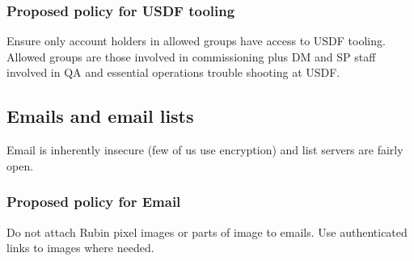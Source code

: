 \subsubsection{Proposed policy for USDF tooling}
Ensure only account holders in allowed groups have access to USDF tooling.
Allowed groups are those involved in commissioning plus DM and SP staff involved in QA and essential operations trouble shooting at USDF.

\subsection{Emails and email  lists }
Email is inherently insecure (few of us use encryption) and list servers are fairly open.

\subsubsection{Proposed policy for Email}
Do not attach Rubin pixel images or parts of image to emails.
Use authenticated links to images where needed.


